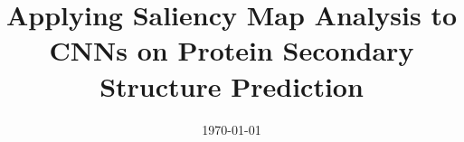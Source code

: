 \documentclass{ecsthesis}      %
\begin{document}
\frontmatter
\title      {Applying Saliency Map Analysis to CNNs on Protein Secondary Structure Prediction}
\addresses  {\groupname\\\deptname\\\univname}
\date       {\today}
\subject    {}
\keywords   {}
\maketitle






\end{document}
